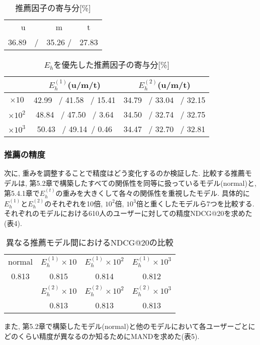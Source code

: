 \documentclass[a4j,11pt]{jarticle}           %
\begin{document}
	\begin{table}[h]
		\centering
		\caption{推薦因子の寄与分[\%]}
		\begin{tabular}{ccc}\hline
			u&m&t \\
			36.89　/& 35.26 /& 27.83  \\ \hline
		\end{tabular}
	\end{table}
	
	\begin{table}[h]
		\centering
		\caption{$E_h$を優先した推薦因子の寄与分[\%]}
		\begin{tabular}{ccc}\hline
			&$E_h^{(1)}$(u/m/t)  &$E_h^{(2)}$(u/m/t) \\ \hline
			$\times10$ & 42.99 \ / 41.58 \ / 15.41 & 34.79 \ / 33.04 \ / 32.15 \\ 
			$\times10^2$ & 48.84 \ / 47.50 \ / 3.64 & 34.50 \ / 32.74 \ / 32.75 \\
			$\times10^3$ &  50.43 \ / 49.14\ / 0.46 & 34.47 \ / 32.70 \ / 32.81 \\ \hline
		\end{tabular}
	\end{table}
	
	\subsubsection{推薦の精度}
	次に, 重みを調整することで精度はどう変化するのか検証した. 比較する推薦モデルは, 第5.2章で構築したすべての関係性を同等に扱っているモデル(normal)と, 第5.4.1章で$E_h^{(t)}$の重みを大きくして各々の関係性を重視したモデル. 具体的に$E_h^{(1)}$と$E_h^{(2)}$のそれぞれを10倍, $10^2$倍, $10^3$倍と重くしたモデルら7つを比較する. それぞれのモデルにおける610人のユーザーに対しての精度NDCG@20を求めた(表4). 
	
	\begin{table}[htbp]
		\centering
		\caption{異なる推薦モデル間におけるNDCG@20の比較}
		\begin{tabular}{cccc}\hline
			normal&$E_h^{(1)}\times10$&$E_h^{(1)}\times10^2$&$E_h^{(1)}\times10^3$\\
			0.813 &0.815 &0.814 &0.812 \\ \hline
			&$E_h^{(2)}\times10$&$E_h^{(2)}\times10^2$&$E_h^{(2)}\times10^3$ \\
			&0.813&0.813&0.813 \\ \hline
		\end{tabular}
	\end{table}
	
	また, 第5.2章で構築したモデル(normal)と他のモデルにおいて各ユーザーごとにどのくらい精度が異なるのか知るためにMANDを求めた(表5). 
	
\end{document}
